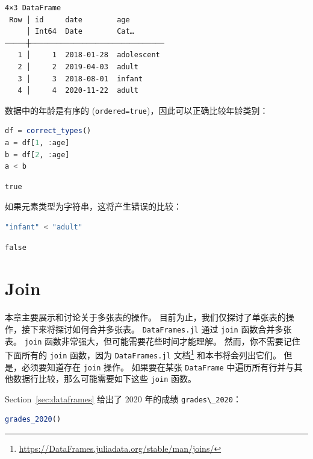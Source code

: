\documentclass[
  notoc %
]{tufte-book}
\DeclareRobustCommand{\href}[2]{#2\footnote{\url{#1}}}
\newcommand{\passthrough}[1]{#1}
\begin{document}
\begin{lstlisting}[language=Output]
4×3 DataFrame
 Row │ id     date        age
     │ Int64  Date        Cat…
─────┼───────────────────────────────
   1 │     1  2018-01-28  adolescent
   2 │     2  2019-04-03  adult
   3 │     3  2018-08-01  infant
   4 │     4  2020-11-22  adult
\end{lstlisting}

数据中的年龄是有序的
(\passthrough{\lstinline!ordered=true!})，因此可以正确比较年龄类别：

\begin{lstlisting}[language=Julia]
df = correct_types()
a = df[1, :age]
b = df[2, :age]
a < b
\end{lstlisting}

\begin{lstlisting}[language=Output]
true
\end{lstlisting}

如果元素类型为字符串，这将产生错误的比较：

\begin{lstlisting}[language=Julia]
"infant" < "adult"
\end{lstlisting}

\begin{lstlisting}[language=Output]
false
\end{lstlisting}

\hypertarget{sec:join}{%
\section{Join}\label{sec:join}}

本章主要展示和讨论关于多张表的操作。
目前为止，我们仅探讨了单张表的操作，接下来将探讨如何合并多张表。
\passthrough{\lstinline!DataFrames.jl!} 通过
\passthrough{\lstinline!join!} 函数合并多张表。
\passthrough{\lstinline!join!}
函数非常强大，但可能需要花些时间才能理解。 然而，你不需要记住下面所有的
\passthrough{\lstinline!join!} 函数，因为
\href{https://DataFrames.juliadata.org/stable/man/joins/}{\passthrough{\lstinline!DataFrames.jl!}
文档} 和本书将会列出它们。 但是，必须要知道存在
\passthrough{\lstinline!join!} 操作。 如果要在某张
\passthrough{\lstinline!DataFrame!}
中遍历所有行并与其他数据行比较，那么可能需要如下这些
\passthrough{\lstinline!join!} 函数。

Section~\ref{sec:dataframes} 给出了 2020 年的成绩
\passthrough{\lstinline!grades\_2020!}：

\begin{lstlisting}[language=Julia]
grades_2020()
\end{lstlisting}
\end{document}
